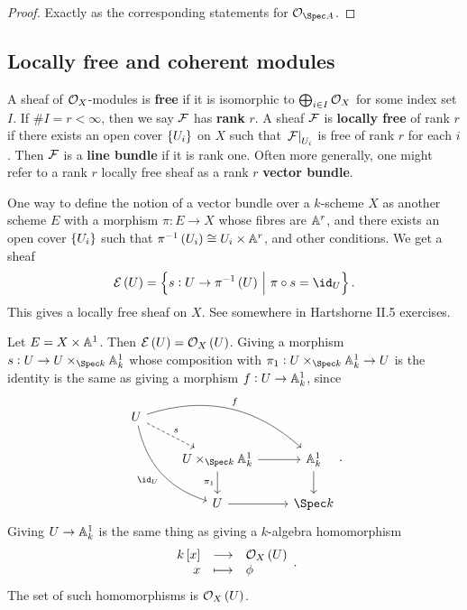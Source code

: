 \begin{proof}
Exactly as the corresponding statements for $ \OOO_{\Spec A} $.
\end{proof}

\subsection{Locally free and coherent modules}

\begin{definition*}
A sheaf of $ \OOO_X $-modules is \textbf{free} if it is isomorphic to $ \bigoplus_{i \in I} \OOO_X $ for some index set $ I $. If $ \#I = r < \infty $, then we say $ \FFF $ has \textbf{rank} $ r $. A sheaf $ \FFF $ is \textbf{locally free} of rank $ r $ if there exists an open cover $ \cbr{U_i} $ on $ X $ such that $ \eval{\FFF}_{U_i} $ is free of rank $ r $ for each $ i $. Then $ \FFF $ is a \textbf{line bundle} if it is rank one. Often more generally, one might refer to a rank $ r $ locally free sheaf as a rank $ r $ \textbf{vector bundle}.
\end{definition*}


\begin{remark*}
One way to define the notion of a vector bundle over a $ k $-scheme $ X $ as another scheme $ E $ with a morphism $ \pi : E \to X $ whose fibres are $ \AA^r $, and there exists an open cover $ \cbr{U_i} $ such that $ \pi^{-1}\br{U_i} \cong U_i \times \AA^r $, and other conditions. We get a sheaf
$$ \EEE\br{U} = \cbr{s : U \to \pi^{-1}\br{U} \st \pi \circ s = \id_U}. $$
This gives a locally free sheaf on $ X $. See somewhere in Hartshorne II.5 exercises.
\end{remark*}

\begin{example*}
Let $ E = X \times \AA^1 $. Then $ \EEE\br{U} = \OOO_X\br{U} $. Giving a morphism $ s : U \to U \times_{\Spec k} \AA_k^1 $ whose composition with $ \pi_1 : U \times_{\Spec k} \AA_k^1 \to U $ is the identity is the same as giving a morphism $ f : U \to \AA_k^1 $, since
$$
\begin{tikzcd}
U \arrow[dashed]{dr}{s} \arrow[bend left=30]{drr}{f} \arrow[bend right=30]{ddr}[swap]{\id_U} & & \\
& U \times_{\Spec k} \AA_k^1 \arrow{r} \arrow{d}[swap]{\pi_1} & \AA_k^1 \arrow{d} \\
& U \arrow{r} & \Spec k
\end{tikzcd}.
$$
Giving $ U \to \AA_k^1 $ is the same thing as giving a $ k $-algebra homomorphism
$$ \function{k\sbr{x}}{\OOO_X\br{U}}{x}{\phi}. $$
The set of such homomorphisms is $ \OOO_X\br{U} $.
\end{example*}

